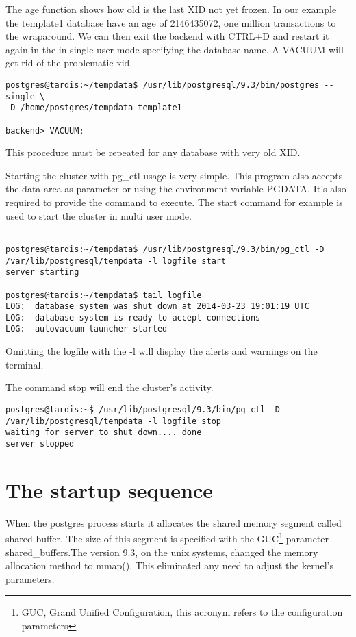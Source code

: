 The age function shows how old is the last XID not yet frozen. In our example the template1
database have an age of 2146435072, one million transactions to the wraparound. We can then exit 
the backend with CTRL+D and restart it again in the in single user mode specifying the database 
name. A VACUUM will get rid of the problematic xid.

\begin{verbatim}
postgres@tardis:~/tempdata$ /usr/lib/postgresql/9.3/bin/postgres --single \
-D /home/postgres/tempdata template1

backend> VACUUM;
\end{verbatim}

This procedure must be repeated for any database with very old XID.\newline

Starting the cluster with pg\_ctl usage is very simple. This program also accepts the data area as 
parameter or using the environment variable PGDATA. It's also required to provide the command to 
execute. The start command for example is used to start the cluster in multi user mode.

\begin{verbatim}

postgres@tardis:~/tempdata$ /usr/lib/postgresql/9.3/bin/pg_ctl -D 
/var/lib/postgresql/tempdata -l logfile start
server starting

postgres@tardis:~/tempdata$ tail logfile 
LOG:  database system was shut down at 2014-03-23 19:01:19 UTC
LOG:  database system is ready to accept connections
LOG:  autovacuum launcher started

\end{verbatim}
Omitting the logfile with the -l will display the alerts and warnings on the terminal.

The command stop will end the cluster's activity.

\begin{verbatim}
postgres@tardis:~$ /usr/lib/postgresql/9.3/bin/pg_ctl -D 
/var/lib/postgresql/tempdata -l logfile stop
waiting for server to shut down.... done
server stopped
\end{verbatim}

\section{The startup sequence}
\label{sec:STARTUP}

When the postgres process starts it allocates the shared memory segment called shared buffer. The
size of this segment is specified with the GUC\footnote{GUC, Grand Unified Configuration, this 
acronym refers to the configuration parameters} parameter shared\_buffers.The
version 9.3, on the
unix systems, changed the memory allocation method to mmap(). This eliminated any need to adjust
the kernel's parameters.

